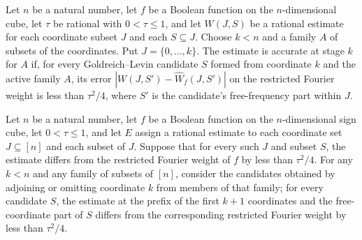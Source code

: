 \begin{definition}
\label{FABL.IsAccurateGoldreichLevinStage}
\leanok
{}
Let $n$ be a natural number, let $f$ be a Boolean function on the $n$-dimensional cube,
let $\tau$ be rational with $0<\tau\leq1$, and let $W(J,S)$ be a rational estimate for
each coordinate subset $J$ and each $S\subseteq J$. Choose $k<n$ and a family $A$ of
subsets of the coordinates. Put $J=\{0,\ldots,k\}$. The estimate is accurate at stage
$k$ for $A$ if, for every Goldreich–Levin candidate $S$ formed from coordinate $k$ and
the active family $A$, its error $|W(J,S')-\widehat W_f(J,S')|$ on the restricted
Fourier weight is less than $\tau^2/4$, where $S'$ is the candidate's free-frequency
part within $J$.
\end{definition}

\begin{theorem}
\label{FABL.isAccurateGoldreichLevinStage_of_isAccurateRestrictedFourierWeightEstimate}
\leanok
{}
Let $n$ be a natural number, let $f$ be a Boolean function on the $n$-dimensional sign
cube, let $0<\tau\le 1$, and let $E$ assign a rational estimate to each coordinate set
$J\subseteq[n]$ and each subset of $J$. Suppose that for every such $J$ and subset $S$,
the estimate differs from the restricted Fourier weight of $f$ by less than $\tau^2/4$.
For any $k<n$ and any family of subsets of $[n]$, consider the candidates obtained by
adjoining or omitting coordinate $k$ from members of that family; for every candidate
$S$, the estimate at the prefix of the first $k+1$ coordinates and the free-coordinate
part of $S$ differs from the corresponding restricted Fourier weight by less than
$\tau^2/4$.
\end{theorem}

